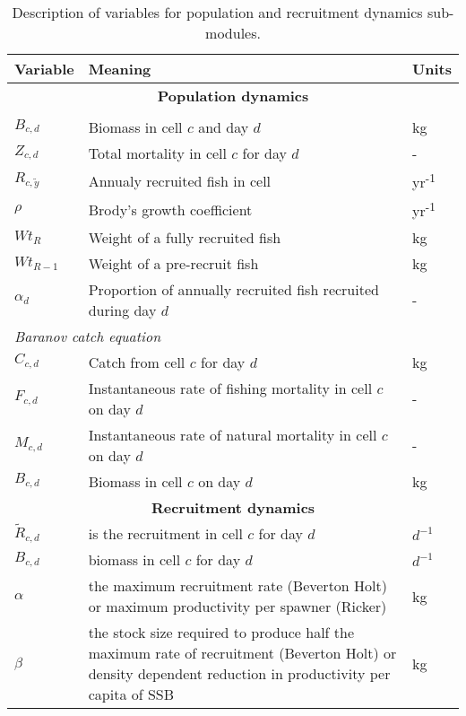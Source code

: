 
\begin{table}[!ht]
	\centering
	\caption{Description of variables for population and recruitment
		dynamics sub-modules.}
	\label{tab: pop_variable}
	\begin{tabular}{p{1.5cm} p{8cm} p{1.5cm}}
		\toprule
		Variable & Meaning & Units \\
		\hline
		\multicolumn{3}{c}{\textbf{Population dynamics}}  \\
		\hhline{===}
		\multicolumn{3}{l}{\textit{Delay-difference model}} \\
		\hline
		$B_{c,d}$ & Biomass in cell $c$ and day $d$ & kg \\
		$Z_{c,d}$ & Total mortality in cell $c$ for day $d$ & - \\
		$R_{c, \tilde{y}}$  &Annualy recruited fish in cell &  yr\textsuperscript{-1} \\
		$\rho$ & Brody's growth coefficient & yr\textsuperscript{-1} \\
		$Wt_{R}$ & Weight of a fully recruited fish & kg \\
		$Wt_{R-1}$ & Weight of a pre-recruit fish & kg \\
		$\alpha_{d}$ & Proportion of annually recruited fish recruited
		during day $d$ & - \\
		\hline
		\multicolumn{3}{l}{\textit{Baranov catch equation}} \\
		\hline
		$C_{c,d}$ & Catch from cell $c$ for day $d$ & kg \\
		$F_{c,d}$ & Instantaneous rate of fishing mortality in cell $c$
		on day $d$ & - \\
		$M_{c,d}$ & Instantaneous rate of natural mortality in cell $c$
		on day $d$ & - \\
		$B_{c,d}$ & Biomass in cell $c$ on day $d$ & kg \\
		\hline
		\multicolumn{3}{c}{\textbf{Recruitment dynamics}} \\
		\hhline{===}
		$\tilde{R}_{c,d}$ & is the recruitment in cell $c$ for day $d$ & $d^{-1}$ \\
		$B_{c,d}$ & biomass in cell $c$ for day $d$ & $d^{-1}$ \\
		$\alpha$ & the maximum recruitment rate (Beverton Holt)
		or maximum productivity per spawner (Ricker) & kg  \\
		$\beta$ & the stock size required to produce half the maximum rate
		of recruitment (Beverton Holt) or density dependent reduction
		in productivity per capita of SSB & kg \\
		\bottomrule
		\end{tabular}
\end{table}

